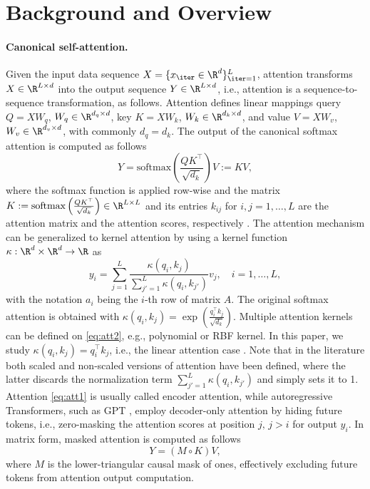 \section{\textbf{Background and Overview}}

\paragraph{Canonical self-attention.} 
Given the input data sequence $X=\{x_{\iter} \in \R^d\}_{\iter=1}^L$, attention transforms $X \in \R^{L \times d}$ into the output sequence $Y \in \R^{L \times d}$, i.e., attention is a sequence-to-sequence transformation, as follows.
Attention defines linear mappings query $Q=XW_q$, $W_q \in \R^{d_q \times d}$, key $K=XW_k$, $W_k \in \R^{d_k \times d}$, and value $V=XW_v$, $W_v \in \R^{d_v \times d}$, with commonly $d_q=d_k$.
The output of the canonical softmax attention \citep{vaswani_attention_2017} is computed as follows
\begin{equation} \label{eq:att1}
Y = \text{softmax}\left( \frac{QK^\top}{\sqrt{d_k}} \right) V := KV,
\end{equation}
where the softmax function is applied row-wise and the matrix $K := \text{softmax}\left( \frac{QK^\top}{\sqrt{d_k}} \right) \in \R^{L \times L}$ and its entries $k_{ij}$ for $i,j=1,\ldots,L$ are the attention matrix and the attention scores, respectively \citep{nguyen2023a}.
The attention mechanism can be generalized to kernel attention by using a kernel function $\kappa: \R^d \times \R^d \to \R$ \citep{tsai2019transformer} as
\begin{equation} \label{eq:att2}
    y_i = \sum_{j=1}^L \frac{\kappa(q_i,k_j)}{\sum_{j'=1}^L \kappa(q_i, k_{j'})} v_j, \quad i=1,\ldots,L,
\end{equation}
with the notation $a_i$ being the $i$-th row of matrix $A$.
The original softmax attention \citep{vaswani_attention_2017} is obtained with $\kappa(q_i,k_j)=\exp (\frac{q_i^\top k_j}{\sqrt{d_k}})$.
Multiple attention kernels can be defined on \eqref{eq:att2}, e.g., polynomial or RBF kernel.
In this paper, we study $\kappa(q_i,k_j)=q_i^\top k_j$, i.e., the linear attention case \citep{trans_rnn}.
Note that in the literature both scaled and non-scaled versions of attention have been defined, where the latter discards the normalization term $\sum_{j'=1}^L \kappa(q_i, k_{j'})$ and simply sets it to 1.
Attention \eqref{eq:att1} is usually called encoder attention, while autoregressive Transformers, such as GPT \citep{radford2018improving}, employ decoder-only attention by hiding future tokens, i.e., zero-masking the attention scores at position $j, \, j > i$ for output $y_i$.
In matrix form, masked attention is computed as follows
\begin{equation} \label{eq:maskedatt}
    Y = (M \circ K) V,
\end{equation}
where $M$ is the lower-triangular causal mask of ones, effectively excluding future tokens from attention output computation.

